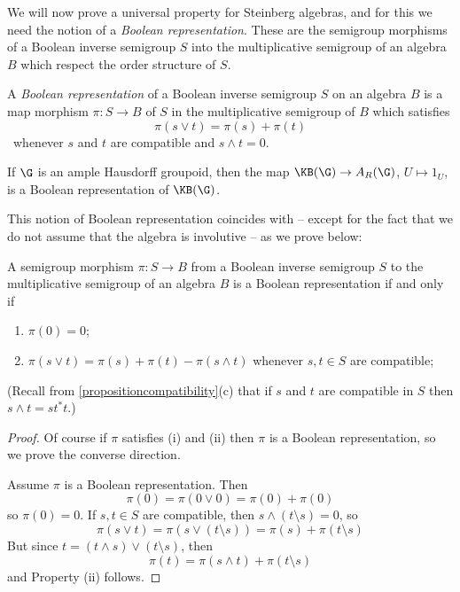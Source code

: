 We will now prove a universal property for Steinberg algebras, and for this we need the notion of a \emph{Boolean representation}. These are the semigroup morphisms of a Boolean inverse semigroup $S$ into the multiplicative semigroup of an algebra $B$ which respect the order structure of $S$.

\begin{definition}[{\cite[Definition 3.9]{MR3274831}}]\label{definitionbooleanrepresentation}
A \emph{Boolean representation} of a Boolean inverse semigroup $S$ on an algebra $B$ is a map morphism $\pi:S\to B$ of $S$ in the multiplicative semigroup of $B$ which satisfies
\[\pi(s\lor t)=\pi(s)+\pi(t)\]\
whenever $s$ and $t$ are compatible and $s\land t=0$.
\end{definition}

\begin{example}
If $\G$ is an ample Hausdorff groupoid, then the map $\KB(\G)\to A_R(\G)$, $U\mapsto 1_U$, is a Boolean representation of $\KB(\G)$.
\end{example}

This notion of Boolean representation coincides with \cite[Definition 3.1]{MR3548134} -- except for the fact that we do not assume that the algebra is involutive -- as we prove below:

\begin{proposition}
A semigroup morphism $\pi:S\to B$ from a Boolean inverse semigroup $S$ to the multiplicative semigroup of an algebra $B$ is a Boolean representation if and only if
\begin{enumerate}
\item[(i)] $\pi(0)=0$;
\item[(ii)] $\pi(s\lor t)=\pi(s)+\pi(t)-\pi(s\land t)$ whenever $s,t\in S$ are compatible;
\end{enumerate}
(Recall from \ref{propositioncompatibility}(c) that if $s$ and $t$ are compatible in $S$ then $s\land t=st^*t$.)
\end{proposition}
\begin{proof}
Of course if $\pi$ satisfies (i) and (ii) then $\pi$ is a Boolean representation, so we prove the converse direction.

Assume $\pi$ is a Boolean representation. Then
\[\pi(0)=\pi(0\lor 0)=\pi(0)+\pi(0)\]
so $\pi(0)=0$. If $s,t\in S$ are compatible, then $s\land(t\setminus s)=0$, so
\[\pi(s\lor t)=\pi(s\lor(t\setminus s))=\pi(s)+\pi(t\setminus s)\]
But since $t=(t\land s)\lor(t\setminus s)$, then
\[\pi(t)=\pi(s\land t)+\pi(t\setminus s)\]
and Property (ii) follows.\qedhere
\end{proof}

